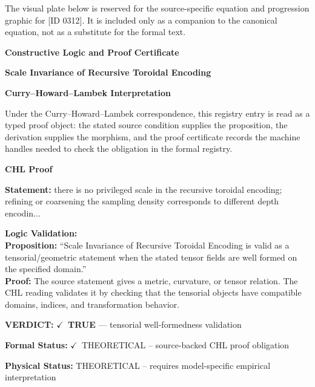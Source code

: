\begingroup\footnotesize\sloppy
The visual plate below is reserved for the source-specific equation and progression graphic for [ID 0312]. It is included only as a companion to the canonical equation, not as a substitute for the formal text.
\par\endgroup
\ifTZPDarkEdition
{}
\fi

\clearpage
\begingroup\tzpsupportsetup
\noindent\textbf{\fontsize{10.8pt}{12.8pt}\selectfont [ID 0312] Constructive Logic and Proof Certificate}\par
\noindent\textbf{\fontsize{10pt}{12pt}\selectfont Scale Invariance of Recursive Toroidal Encoding}\par
\vspace{0.45em}
\begingroup
\footnotesize
\setlength{\parskip}{0.22em}
\setlength{\parindent}{0pt}
\noindent\textbf{Curry--Howard--Lambek Interpretation}\par
Under the Curry--Howard--Lambek correspondence, this registry entry is read as a typed proof
object: the stated source condition supplies the proposition, the derivation supplies the
morphism, and the proof certificate records the machine handles needed to check the obligation
in the formal registry.

\vspace{0.45em}
\noindent\textbf{CHL Proof}\par
\textbf{Statement:} there is no privileged scale in the recursive toroidal encoding; refining or coarsening
the sampling density corresponds to different depth encodin...

\textbf{Logic Validation:}\\
\textbf{Proposition:} ``Scale Invariance of Recursive Toroidal Encoding is valid as a tensorial/geometric
statement when the stated tensor fields are well formed on the specified domain.''\\
\textbf{Proof:} The source statement gives a metric, curvature, or tensor relation. The CHL reading
validates it by checking that the tensorial objects have compatible domains, indices,
and transformation behavior.

\textbf{VERDICT:} \ensuremath{\checkmark}\ \textbf{TRUE} --- tensorial well-formedness validation

\textbf{Formal Status:} \ensuremath{\checkmark}\ THEORETICAL -- source-backed CHL proof obligation

\textbf{Physical Status:} THEORETICAL -- requires model-specific empirical interpretation
\par\vspace{0.45em}
\par
\ifTZPDarkEdition
{}
\fi
\endgroup
\endgroup
